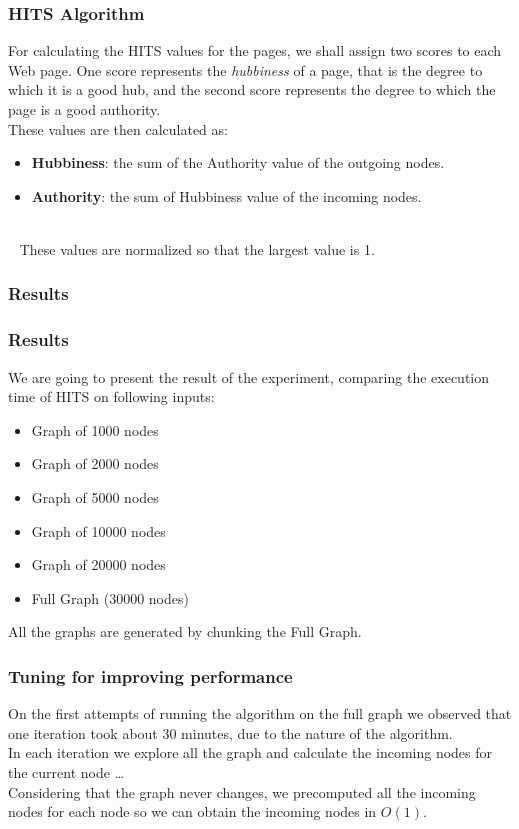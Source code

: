 \documentclass{beamer}
\begin{document}
\begin{frame}
\frametitle{HITS Algorithm}
For calculating the HITS values for the pages, we shall assign two scores to each Web page.
One score represents the \textit{hubbiness} of a page, that is the degree to which it
is a good hub, and the second score represents the degree to which the page
is a good authority.\\
\medskip
These values  are then calculated as:
\begin{itemize}
\item {} \textbf{Hubbiness}: the sum of the Authority value of the outgoing nodes.
\item {} \textbf{Authority}: the sum of Hubbiness value of the incoming nodes.
\end{itemize}
\-\\\
\smallskip
\onslide<3-> These values are normalized so that the largest value is 1.
\end{frame}

\subsubsection{Results}
\begin{frame}
\frametitle{Results}
We are going to present the result of the experiment, comparing the \alert{execution time} of HITS on following inputs:
\begin{itemize}
\item Graph of 1000 nodes
\item Graph of 2000 nodes
\item Graph of 5000 nodes
\item Graph of 10000 nodes
\item Graph of 20000 nodes
\item Full Graph (30000 nodes) 
\end{itemize}
All the graphs are generated by chunking the Full Graph.
\end{frame}

\begin{frame}
\frametitle{Tuning for improving performance}
On the first attempts of running the algorithm on the full graph we observed that one iteration took about 30 minutes, due to the nature of the algorithm. \\
In each iteration we explore all the graph and calculate the incoming nodes for the current node \dots\\
\bigskip
Considering that the graph never changes, we precomputed all the incoming nodes for each node so we can obtain the incoming nodes in $O(1)$.
\end{frame}
\end{document}
